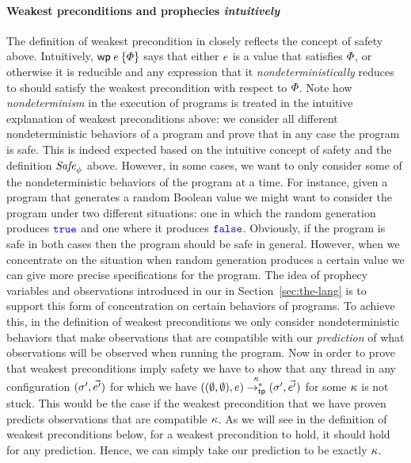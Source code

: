\documentclass{article}
\begin{document}
\paragraph{Weakest preconditions and prophecies \emph{intuitively}}
The definition of weakest precondition in \Iris{} closely reflects the
concept of safety above. Intuitively, $\wpre{\expr}{\pred}$ says that
either $e$ is a value that satisfies $\varPhi$, or otherwise it is
reducible and any expression that it \emph{nondeterministically}
reduces to should satisfy the weakest precondition with respect to
$\varPhi$. Note how \emph{nondeterminism} in the execution of programs
is treated in the intuitive explanation of weakest preconditions
above: we consider all different nondeterministic behaviors of a
program and prove that in any case the program is safe. This is indeed
expected based on the intuitive concept of safety and the definition
$\mathit{Safe}_{\phi}$ above. However, in some cases, we want to only
consider some of the nondeterministic behaviors of the program at a
time. For instance, given a program that generates a random Boolean
value we might want to consider the program under two different
situations: one in which the random generation produces $\textnormal{\texttt{\color{blue} true}}$ and
one where it produces $\textnormal{\texttt{\color{blue} false}}$. Obviously, if the program is safe in
both cases then the program should be safe in general. However, when
we concentrate on the situation when random generation produces a
certain value we can give more precise specifications for the
program. The idea of prophecy variables and observations introduced in
our \TheLang{} in Section~\ref{sec:the-lang} is to support this form
of concentration on certain behaviors of programs. To achieve this, in
the definition of weakest preconditions we only consider
nondeterministic behaviors that make observations that are compatible
with our \emph{prediction} of what observations will be observed when
running the program. Now in order to prove that weakest preconditions
imply safety we have to show that any thread in any configuration
$(\sigma', \vec{e'})$ for which we have
$((\emptyset, \emptyset), e) \overset{\kappa}{\rightarrow_{\mathsf{tp}}^*}
(\sigma', \vec{e'})$ for some $\kappa$ is not stuck. This
would be the case if the weakest precondition that we have proven
predicts observations that are compatible $\kappa$. As we will
see in the definition of weakest preconditions below, for a weakest
precondition to hold, it should hold for any prediction. Hence, we can
simply take our prediction to be exactly $\kappa$.
\end{document}
